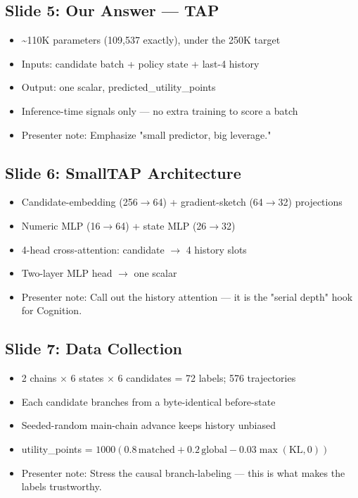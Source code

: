\documentclass[11pt,letterpaper]{article}
\begin{document}
\subsection*{Slide 5: Our Answer --- TAP}

\begin{itemize}
\item \textasciitilde{}110K parameters (109,537 exactly), under the 250K target
\item Inputs: candidate batch + policy state + last-4 history
\item Output: one scalar, predicted\_utility\_points
\item Inference-time signals only --- no extra training to score a batch
\item Presenter note: Emphasize "small predictor, big leverage."
\end{itemize}

\subsection*{Slide 6: SmallTAP Architecture}

\begin{itemize}
\item Candidate-embedding (256$\rightarrow$64) + gradient-sketch (64$\rightarrow$32) projections
\item Numeric MLP (16$\rightarrow$64) + state MLP (26$\rightarrow$32)
\item 4-head cross-attention: candidate $\rightarrow$ 4 history slots
\item Two-layer MLP head $\rightarrow$ one scalar
\item Presenter note: Call out the history attention --- it is the "serial depth" hook for Cognition.
\end{itemize}

\subsection*{Slide 7: Data Collection}

\begin{itemize}
\item 2 chains $\times$ 6 states $\times$ 6 candidates = 72 labels; 576 trajectories
\item Each candidate branches from a byte-identical before-state
\item Seeded-random main-chain advance keeps history unbiased
\item utility\_points = $1000(0.8\,\text{matched} + 0.2\,\text{global} - 0.03\max(\text{KL},0))$
\item Presenter note: Stress the causal branch-labeling --- this is what makes the labels trustworthy.
\end{itemize}
\end{document}
